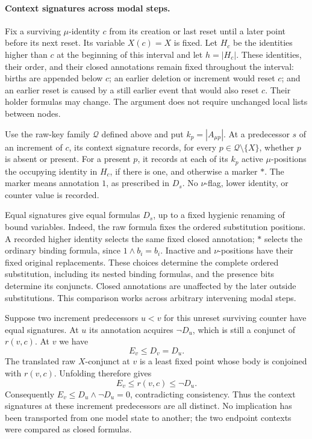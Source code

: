\paragraph{Context signatures across modal steps.}
Fix a surviving \(\mu\)-identity \(c\)
from its creation or last reset
until a later point before its
next reset. Its variable \(X(c)=X\)
is fixed. Let \(H_c\) be the identities
higher than \(c\) at the beginning
of this interval and let \(h=|H_c|\).
These identities, their order,
and their closed annotations remain
fixed throughout the interval:
births are appended below \(c\);
an earlier deletion or increment
would reset \(c\); and an earlier
reset is caused by a still earlier
event that would also reset \(c\).
Their holder formulas may change.
The argument does not require
unchanged local lists between nodes.

Use the raw-key family \(\mathcal Q\)
defined above and put
\(k_p=|A_{\mu p}|\).
At a predecessor \(s\) of an
increment of \(c\), its context
signature records, for every
\(p\in\mathcal Q\setminus\{X\}\),
whether \(p\) is absent or present.
For a present \(p\), it records
at each of its \(k_p\) active
\(\mu\)-positions the occupying
identity in \(H_c\), if there is
one, and otherwise a marker \(*\).
The marker means annotation \(1\),
as prescribed in \(D_s\).
No \(\nu\)-flag, lower identity,
or counter value is recorded.

Equal signatures give equal
formulas \(D_s\), up to a fixed
hygienic renaming of bound variables.
Indeed, the raw formula fixes the
ordered substitution positions.
A recorded higher identity selects
the same fixed closed annotation;
\(*\) selects the ordinary binding
formula, since \(1\land b_i=b_i\).
Inactive and \(\nu\)-positions have
their fixed original replacements.
These choices determine the complete
ordered substitution, including
its nested binding formulas, and
the presence bits determine its
conjuncts. Closed annotations are
unaffected by the later outside
substitutions. This comparison
works across arbitrary intervening
modal steps.

Suppose two increment predecessors
\(u<v\) for this unreset surviving
counter have equal signatures.
At \(u\) its annotation acquires
\(\neg D_u\), which is still a
conjunct of \(r(v,c)\).
At \(v\) we have
\[
 E_v\leq D_v=D_u.
\]
The translated raw \(X\)-conjunct
at \(v\) is a least fixed point
whose body is conjoined with
\(r(v,c)\). Unfolding therefore gives
\[
 E_v\leq r(v,c)\leq\neg D_u.
\]
Consequently \(E_v\leq D_u\land\neg D_u=0\),
contradicting consistency.
Thus the context signatures at
these increment predecessors
are all distinct.
No implication has been transported
from one model state to another;
the two endpoint contexts were
compared as closed formulas.

